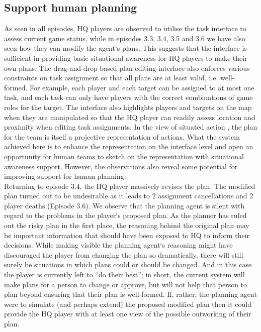 \subsection{Support human planning} \label{sec:study3supportPlanning}
As seen in all episodes, HQ players are observed to utilise the task interface to assess current game status, while in episodes 3.3, 3.4, 3.5 and 3.6 we have also seen how they can modify the agent`s plans. This suggests that the interface is sufficient in providing basic situational awareness for HQ players to make their own plans. The drag-and-drop based plan editing interface also enforces various constraints on task assignment so that all plans are at least valid, i.e. well-formed. For example, each player and each target can be assigned to at most one task, and each task can only have players with the correct combinations of game roles for the target. The interface also highlights players and targets on the map when they are manipulated so that the HQ player can readily assess location and proximity when editing task assignments. In the view of situated action \citep{Suchman1987}, the plan for the team is itself a projective representation of actions. What the system achieved here is to enhance the representation on the interface level and open an opportunity for human teams to sketch on the representation with situational awareness support. However, the observations also reveal some potential for improving support for human planning.\\

Returning to episode 3.4, the HQ player massively revises the plan. The modified plan turned out to be undesirable as it leads to 2 assignment cancellations and 2 player deaths (Episode 3.6).  We observe that the planning agent is silent with regard to the problems in the player`s proposed plan. As the planner has ruled out the risky plan in the first place, the reasoning behind the original plan may be important information that should have been exposed to HQ to inform their decisions. While making visible the planning agent`s reasoning might have discouraged the player from changing the plan so dramatically, there will still surely be situations in which plans could or should be changed. And in this case the player is currently left to ``do their best''; in short, the current system will make plans for a person to change or approve, but will not help that person to plan beyond ensuring that their plan is well-formed. If, rather, the planning agent were to simulate (and perhaps extend) the proposed modified plan then it could provide the HQ player with at least one view of the possible outworking of their plan.\\

